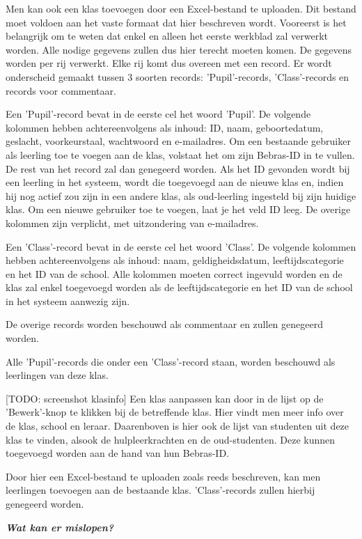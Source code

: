 \documentclass[]{article}
\begin{document}
Men kan ook een klas toevoegen door een Excel-bestand te uploaden. Dit bestand moet voldoen aan het vaste formaat dat hier beschreven wordt. 
Vooreerst is het belangrijk om te weten dat enkel en alleen het eerste werkblad zal verwerkt worden. Alle nodige gegevens zullen dus hier terecht moeten komen. De gegevens worden per rij verwerkt. Elke rij komt dus overeen met een record. Er wordt onderscheid gemaakt tussen 3 soorten records: 'Pupil'-records, 'Class'-records en records voor commentaar.

Een 'Pupil'-record bevat in de eerste cel het woord 'Pupil'. De volgende kolommen hebben achtereenvolgens als inhoud: ID, naam, geboortedatum, geslacht, voorkeurstaal, wachtwoord en e-mailadres. Om een bestaande gebruiker als leerling toe te voegen aan de klas, volstaat het om zijn Bebras-ID in te vullen. De rest van het record zal dan genegeerd worden. Als het ID gevonden wordt bij een leerling in het systeem, wordt die toegevoegd aan de nieuwe klas en, indien hij nog actief zou zijn in een andere klas, als oud-leerling ingesteld bij zijn huidige klas.  
Om een nieuwe gebruiker toe te voegen, laat je het veld ID leeg. De overige kolommen zijn verplicht, met uitzondering van e-mailadres.

Een 'Class'-record bevat in de eerste cel het woord 'Class'. De volgende kolommen hebben achtereenvolgens als inhoud: naam, geldigheidsdatum, leeftijdscategorie en het ID van de school. Alle kolommen moeten correct ingevuld worden en de klas zal enkel toegevoegd worden als de leeftijdscategorie en het ID van de school in het systeem aanwezig zijn. 

De overige records worden beschouwd als commentaar en zullen genegeerd worden.

Alle 'Pupil'-records die onder een 'Class'-record staan, worden beschouwd als leerlingen van deze klas. 

[TODO: screenshot klasinfo]
Een klas aanpassen kan door in de lijst op de 'Bewerk'-knop te klikken bij de betreffende klas. Hier vindt men meer info over de klas, school en leraar. Daarenboven is hier ook de lijst van studenten uit deze klas te vinden, alsook de hulpleerkrachten en de oud-studenten. Deze kunnen toegevoegd worden aan de hand van hun Bebras-ID.

Door hier een Excel-bestand te uploaden zoals reeds beschreven, kan men leerlingen toevoegen aan de bestaande klas. 'Class'-records zullen hierbij genegeerd worden.

\textbf{\textit{Wat kan er mislopen?}}
\end{document}
